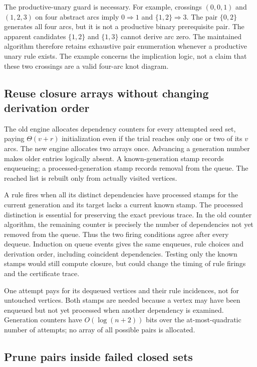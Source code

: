 The productive-unary guard is necessary. For example, crossings
$(0,0,1)$ and $(1,2,3)$ on four abstract arcs imply $0\Rightarrow1$ and
$\{1,2\}\Rightarrow3$. The pair $\{0,2\}$ generates all four arcs, but
it is not a productive binary prerequisite pair. The apparent candidates
$\{1,2\}$ and $\{1,3\}$ cannot derive arc zero. The maintained algorithm
therefore retains exhaustive pair enumeration whenever a productive unary
rule exists. The example concerns the implication logic, not a claim that
these two crossings are a valid four-arc knot diagram.

\subsection{Reuse closure arrays without changing derivation order}

The old engine allocates dependency counters for every attempted seed set,
paying $\Theta(v+r)$ initialization even if the trial reaches only one or
two of its $v$ arcs. The new engine allocates two arrays once. Advancing a
generation number makes older entries logically absent. A known-generation
stamp records enqueueing; a processed-generation stamp records removal from
the queue. The reached list is rebuilt only from actually visited vertices.

A rule fires when all its distinct dependencies have processed stamps for
the current generation and its target lacks a current known stamp. The
processed distinction is essential for preserving the exact previous trace.
In the old counter algorithm, the remaining counter is precisely the number
of dependencies not yet removed from the queue. Thus the two firing
conditions agree after every dequeue. Induction on queue events gives the
same enqueues, rule choices and derivation order, including coincident
dependencies. Testing only the known stamps would still compute closure,
but could change the timing of rule firings and the certificate trace.

One attempt pays for its dequeued vertices and their rule incidences, not
for untouched vertices. Both stamps are needed because a vertex may have
been enqueued but not yet processed when another dependency is examined.
Generation counters have $O(\log(n+2))$ bits over the at-most-quadratic number
of attempts; no array of all possible pairs is allocated.

\subsection{Prune pairs inside failed closed sets}

